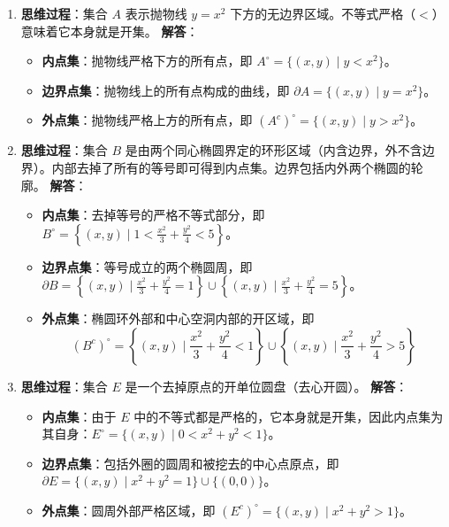 \documentclass[lang=cn,11pt]{elegantbook}
\begin{document}
\begin{solution}
\begin{enumerate}
  \item[(1)] \textbf{思维过程}：集合 $A$ 表示抛物线 $y = x^2$ 下方的无边界区域。不等式严格（$<$）意味着它本身就是开集。
  \textbf{解答}：
  \begin{itemize}
    \item \textbf{内点集}：抛物线严格下方的所有点，即 $A^\circ = \{(x,y) \mid y < x^2\}$。
    \item \textbf{边界点集}：抛物线上的所有点构成的曲线，即 $\partial A = \{(x,y) \mid y = x^2\}$。
    \item \textbf{外点集}：抛物线严格上方的所有点，即 $(A^c)^\circ = \{(x,y) \mid y > x^2\}$。
  \end{itemize}

  \item[(2)] \textbf{思维过程}：集合 $B$ 是由两个同心椭圆界定的环形区域（内含边界，外不含边界）。内部去掉了所有的等号即可得到内点集。边界包括内外两个椭圆的轮廓。
  \textbf{解答}：
  \begin{itemize}
    \item \textbf{内点集}：去掉等号的严格不等式部分，即 $B^\circ = \left\{(x,y) \mid 1 < \frac{x^2}{3} + \frac{y^2}{4} < 5\right\}$。
    \item \textbf{边界点集}：等号成立的两个椭圆周，即 $\partial B = \left\{(x,y) \mid \frac{x^2}{3} + \frac{y^2}{4} = 1\right\} \cup \left\{(x,y) \mid \frac{x^2}{3} + \frac{y^2}{4} = 5\right\}$。
    \item \textbf{外点集}：椭圆环外部和中心空洞内部的开区域，即 \[(B^c)^\circ = \left\{(x,y) \mid \frac{x^2}{3} + \frac{y^2}{4} < 1\right\} \cup \left\{(x,y) \mid \frac{x^2}{3} + \frac{y^2}{4} > 5\right\}\]
  \end{itemize}

  \item[(3)] \textbf{思维过程}：集合 $E$ 是一个去掉原点的开单位圆盘（去心开圆）。
  \textbf{解答}：
  \begin{itemize}
    \item \textbf{内点集}：由于 $E$ 中的不等式都是严格的，它本身就是开集，因此内点集为其自身：$E^\circ = \{(x,y) \mid 0 < x^2+y^2 < 1\}$。
    \item \textbf{边界点集}：包括外圈的圆周和被挖去的中心点原点，即 $\partial E = \{(x,y) \mid x^2+y^2 = 1\} \cup \{(0,0)\}$。
    \item \textbf{外点集}：圆周外部严格区域，即 $(E^c)^\circ = \{(x,y) \mid x^2+y^2 > 1\}$。
  \end{itemize}


\end{enumerate}
\end{solution}
\end{document}
